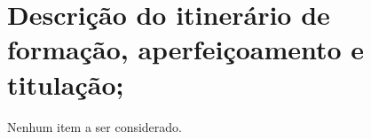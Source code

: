 \section[Descrição do itinerário de formação, aperfeiçoamento e titulação]{Descrição do itinerário de formação, aperfeiçoamento e titulação;}

Nenhum item a ser considerado.